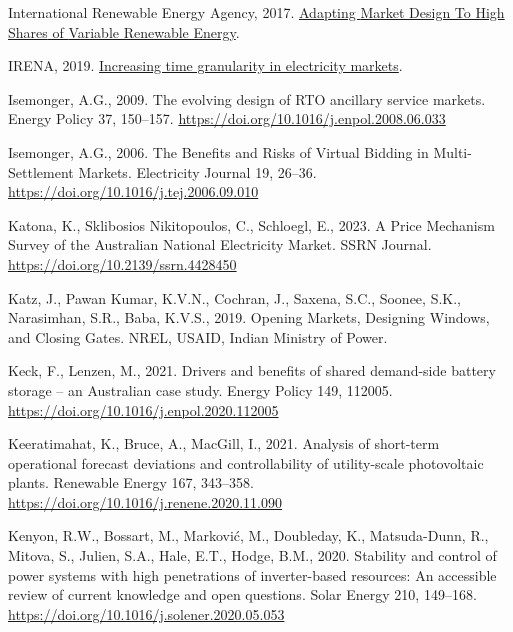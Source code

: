\documentclass[12pt,a4paper,]{report}
\newlength{\cslhangindent}
\newenvironment{CSLReferences}[2] %
 {%
  \setlength{\parindent}{0pt}
  \ifodd #1 \everypar{\setlength{\hangindent}{\cslhangindent}}\ignorespaces\fi
  \ifnum #2 > 0
  \setlength{\parskip}{#2\baselineskip}
  \fi
 }%
 {}
\begin{document}
\begin{CSLReferences}{1}{0}
\leavevmode{}%
International Renewable Energy Agency, 2017.
\href{http://www.irena.org/publications/2017/May/Adapting-Market-Design-to-High-Shares-of-Variable-Renewable-Energy}{Adapting
{Market Design To High Shares} of {Variable Renewable Energy}}.

\leavevmode{}%
IRENA, 2019. \href{https://www.irena.org}{Increasing time granularity in
electricity markets}.

\leavevmode{}%
Isemonger, A.G., 2009. The evolving design of {RTO} ancillary service
markets. Energy Policy 37, 150--157.
\url{https://doi.org/10.1016/j.enpol.2008.06.033}

\leavevmode{}%
Isemonger, A.G., 2006. The {Benefits} and {Risks} of {Virtual Bidding}
in {Multi-Settlement Markets}. Electricity Journal 19, 26--36.
\url{https://doi.org/10.1016/j.tej.2006.09.010}

\leavevmode{}%
Katona, K., Sklibosios Nikitopoulos, C., Schloegl, E., 2023. A {Price
Mechanism Survey} of the {Australian National Electricity Market}. SSRN
Journal. \url{https://doi.org/10.2139/ssrn.4428450}

\leavevmode{}%
Katz, J., Pawan Kumar, K.V.N., Cochran, J., Saxena, S.C., Soonee, S.K.,
Narasimhan, S.R., Baba, K.V.S., 2019. Opening {Markets}, {Designing
Windows}, and {Closing Gates}. {NREL, USAID, Indian Ministry of Power}.

\leavevmode{}%
Keck, F., Lenzen, M., 2021. Drivers and benefits of shared demand-side
battery storage -- an {Australian} case study. Energy Policy 149,
112005. \url{https://doi.org/10.1016/j.enpol.2020.112005}

\leavevmode{}%
Keeratimahat, K., Bruce, A., MacGill, I., 2021. Analysis of short-term
operational forecast deviations and controllability of utility-scale
photovoltaic plants. Renewable Energy 167, 343--358.
\url{https://doi.org/10.1016/j.renene.2020.11.090}

\leavevmode{}%
Kenyon, R.W., Bossart, M., Marković, M., Doubleday, K., Matsuda-Dunn,
R., Mitova, S., Julien, S.A., Hale, E.T., Hodge, B.M., 2020. Stability
and control of power systems with high penetrations of inverter-based
resources: {An} accessible review of current knowledge and open
questions. Solar Energy 210, 149--168.
\url{https://doi.org/10.1016/j.solener.2020.05.053}


\end{CSLReferences}
\end{document}
